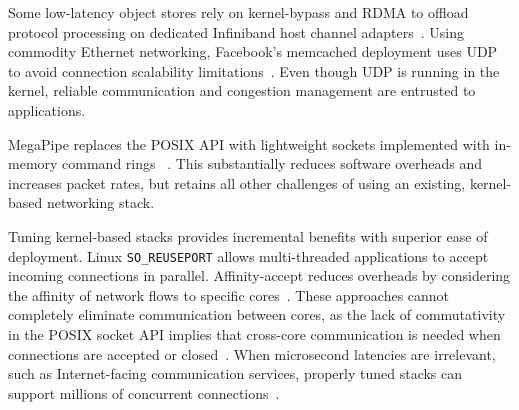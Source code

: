  Some low-latency object stores rely on
kernel-bypass and RDMA to offload protocol processing on dedicated
Infiniband host channel
adapters~\cite{DBLP:conf/sosp/OngaroRSOR11,Jose:2011:MDH,mitchell:rdma,dragojevic14farm}.
Using commodity Ethernet networking, Facebook's memcached deployment
uses UDP to avoid connection scalability
limitations~\cite{nishtala2013scaling}. Even though UDP is running in
the kernel, reliable communication and congestion management are
entrusted to applications.

 MegaPipe replaces the POSIX
API with lightweight sockets implemented with in-memory command
rings~\cite{han2012megapipe} . This substantially reduces software
overheads and increases packet rates, but retains all other challenges
of using an existing, kernel-based networking stack.

 Tuning kernel-based stacks provides
incremental benefits with superior ease of deployment.  Linux
\texttt{SO\_REUSEPORT} allows multi-threaded applications to accept
incoming connections in parallel. Affinity-accept reduces overheads by
considering the affinity of network flows to specific
cores~\cite{DBLP:conf/eurosys/PesterevSZM12}. These approaches cannot
completely eliminate communication between cores, as the lack of
commutativity in the POSIX socket API implies that cross-core
communication is needed when connections are accepted or
closed~\cite{DBLP:conf/sosp/ClementsKZMK13}. When microsecond
latencies are irrelevant, such as Internet-facing communication
services, properly tuned stacks can support millions of concurrent
connections~\cite{whatsapp-2mil}.

